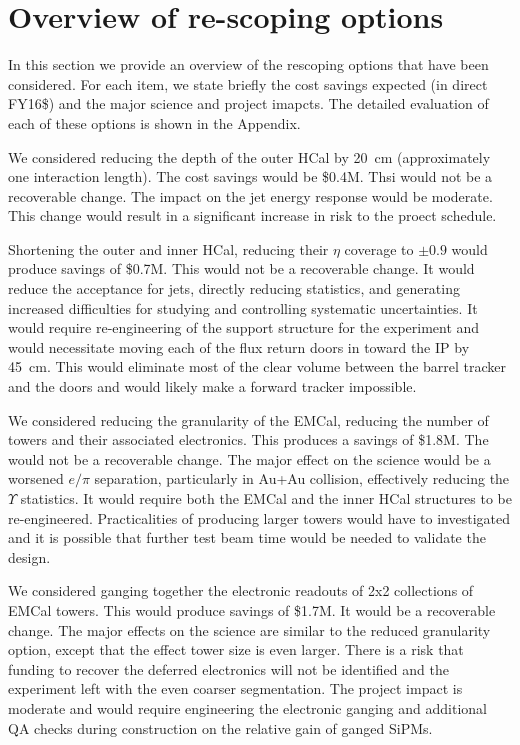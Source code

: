 
\section{Overview of re-scoping options}
\label{sec:overview-re-scoping}

In this section we provide an overview of the rescoping options that
have been considered.  For each item, we state briefly the cost
savings expected (in direct FY16\$) and the major science and project
imapcts.  The detailed evaluation of each of these options is shown in
the Appendix.

We considered reducing the depth of the outer HCal by 20~cm
(approximately one interaction length).  The cost savings would be
\$0.4M.  Thsi would not be a recoverable change. The impact on the jet
energy response would be moderate.  This change would result in a
significant increase in risk to the proect schedule.

Shortening the outer and inner HCal, reducing their $\eta$ coverage to
$\pm0.9$ would produce savings of \$0.7M.  This would not be a
recoverable change.  It would reduce the acceptance for jets, directly
reducing statistics, and generating increased difficulties for
studying and controlling systematic uncertainties.  It would require
re-engineering of the support structure for the experiment and would
necessitate moving each of the flux return doors in toward the IP by
45~cm.  This would eliminate most of the clear volume between the
barrel tracker and the doors and would likely make a forward tracker
impossible.

We considered reducing the granularity of the EMCal, reducing the
number of towers and their associated electronics.  This produces a
savings of \$1.8M.  The would not be a recoverable change.  The major
effect on the science would be a worsened $e/\pi$ separation,
particularly in Au+Au collision, effectively reducing the $\Upsilon$
statistics.  It would require both the EMCal and the inner HCal
structures to be re-engineered.  Practicalities of producing larger towers
would have to investigated and it is possible that further test beam
time would be needed to validate the design.

We considered ganging together the electronic readouts of 2x2
collections of EMCal towers. This would produce savings of \$1.7M.  It
would be a recoverable change.  The major effects on the science are
similar to the reduced granularity option, except that the effect
tower size is even larger.  There is a risk that funding to recover
the deferred electronics will not be identified and the experiment
left with the even coarser segmentation.  The project impact is
moderate and would require engineering the electronic ganging and
additional QA checks during construction on the relative gain of
ganged SiPMs. 

